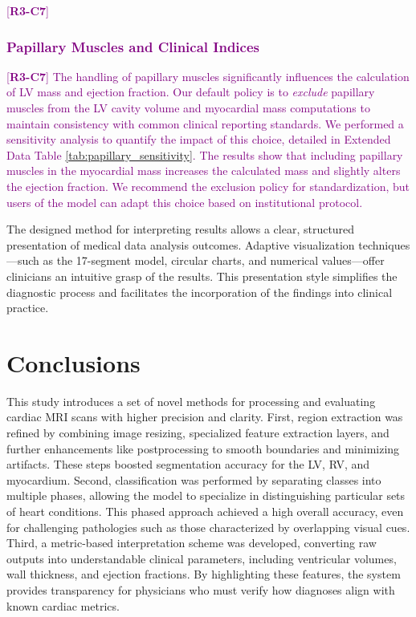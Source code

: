 \documentclass[fleqn,10pt]{wlscirep}
\newcommand{\revtag}[2]{[\textbf{R#1-C#2}]}
\newcommand{\Rthree}[1]{\textcolor{purple}{#1}}
\begin{document}
\Rthree{\revtag{3}{7}\subsubsection*{Papillary Muscles and Clinical Indices}}
\Rthree{\revtag{3}{7} %
The handling of papillary muscles significantly influences the calculation of LV mass and ejection fraction. Our default policy is to \emph{exclude} papillary muscles from the LV cavity volume and myocardial mass computations to maintain consistency with common clinical reporting standards. We performed a sensitivity analysis to quantify the impact of this choice, detailed in Extended Data Table \ref{tab:papillary_sensitivity}. The results show that including papillary muscles in the myocardial mass increases the calculated mass and slightly alters the ejection fraction. We recommend the exclusion policy for standardization, but users of the model can adapt this choice based on institutional protocol.
}

The designed method for interpreting results allows a clear, structured presentation of medical data analysis outcomes. Adaptive visualization techniques—such as the 17-segment model, circular charts, and numerical values—offer clinicians an intuitive grasp of the results. This presentation style simplifies the diagnostic process and facilitates the incorporation of the findings into clinical practice.

\section*{Conclusions}

This study introduces a set of novel methods for processing and evaluating cardiac MRI scans with higher precision and clarity. First, region extraction was refined by combining image resizing, specialized feature extraction layers, and further enhancements like postprocessing to smooth boundaries and minimizing artifacts. These steps boosted segmentation accuracy for the LV, RV, and myocardium. Second, classification was performed by separating classes into multiple phases, allowing the model to specialize in distinguishing particular sets of heart conditions. This phased approach achieved a high overall accuracy, even for challenging pathologies such as those characterized by overlapping visual cues. Third, a metric-based interpretation scheme was developed, converting raw outputs into understandable clinical parameters, including ventricular volumes, wall thickness, and ejection fractions. By highlighting these features, the system provides transparency for physicians who must verify how diagnoses align with known cardiac metrics.
\end{document}
